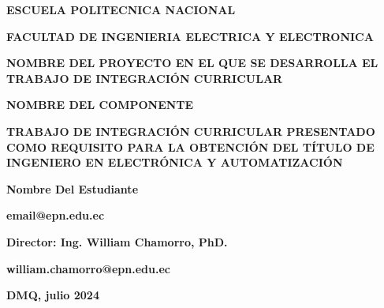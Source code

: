 \begin{titlepage}
    \centering
    \vspace{1cm}
    {\fontsize{24pt}{24pt}\selectfont \bfseries ESCUELA POLITECNICA NACIONAL \par}
    
    \vspace{1.5cm}
    {\fontsize{16pt}{16pt}\selectfont \bfseries FACULTAD DE INGENIERIA ELECTRICA Y  ELECTRONICA \par}
    \vspace{2cm}
        {\fontsize{14pt}{14pt}\selectfont \bfseries NOMBRE DEL PROYECTO EN EL QUE SE DESARROLLA EL TRABAJO DE INTEGRACIÓN CURRICULAR \par}
    \vspace{2cm}
     {\fontsize{14pt}{14pt}\selectfont \bfseries NOMBRE DEL COMPONENTE \par}
    \vspace{2cm}



    {\fontsize{12pt}{12pt}\selectfont \bfseries TRABAJO DE INTEGRACIÓN CURRICULAR PRESENTADO COMO REQUISITO PARA LA OBTENCIÓN DEL TÍTULO DE INGENIERO EN ELECTRÓNICA Y AUTOMATIZACIÓN \par}
         
    \vspace{2cm}
    
     {\fontsize{12pt}{12pt}\selectfont \bfseries Nombre Del Estudiante \par}
    \vspace{0.1cm}
    
     {\fontsize{12pt}{12pt}\selectfont \bfseries email@epn.edu.ec \par}
    \vspace{0.1cm}

        {\fontsize{12pt}{12pt}\selectfont \bfseries Director: Ing. William Chamorro, PhD. \par}
    \vspace{0.1cm}
    
     {\fontsize{12pt}{12pt}\selectfont \bfseries william.chamorro@epn.edu.ec \par}
    \vspace{0.1cm}

    
    \vspace{2cm}
    {\fontsize{12pt}{12pt}\selectfont \bfseries DMQ, julio 2024 \par}
 
\end{titlepage}

